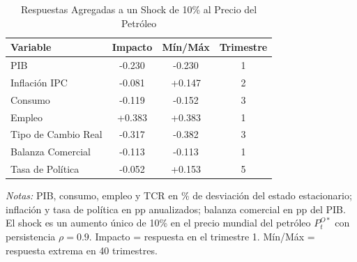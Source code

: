 \begin{table}[htbp]
\centering
\caption{Respuestas Agregadas a un Shock de 10\% al Precio del Petróleo}
\label{tab:oil_agg}
\begin{threeparttable}
\begin{tabular}{@{}l c c c@{}}
\toprule
Variable & Impacto & Mín/Máx & Trimestre \\
\midrule
PIB & -0.230 & -0.230 & 1 \\
Inflación IPC & -0.081 & +0.147 & 2 \\
Consumo & -0.119 & -0.152 & 3 \\
Empleo & +0.383 & +0.383 & 1 \\
Tipo de Cambio Real & -0.317 & -0.382 & 3 \\
Balanza Comercial & -0.113 & -0.113 & 1 \\
Tasa de Política & -0.052 & +0.153 & 5 \\
\bottomrule
\end{tabular}
\begin{tablenotes}[flushleft]
\footnotesize
\item \textit{Notas:} PIB, consumo, empleo y TCR en \% de desviación del estado estacionario; inflación y tasa de política en pp anualizados; balanza comercial en pp del PIB. El shock es un aumento único de 10\% en el precio mundial del petróleo $P^{O*}_t$ con persistencia $\rho = 0.9$. Impacto = respuesta en el trimestre 1. Mín/Máx = respuesta extrema en 40 trimestres.
\end{tablenotes}
\end{threeparttable}
\end{table}
